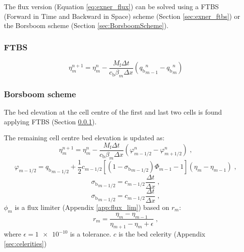 \documentclass{deltares_report_elv}
\newcommand{\mathsub}[2]{#1_{\mathrm{#2}}}
\begin{document}
\newcommand{\BorsboomScheme}{Borsboom scheme}

The flux version (Equation \ref{eq:exner_flux}) can be solved using a FTBS (Forward in Time and Backward in Space) scheme (Section \ref{sec:exner_ftbs}) or the \BorsboomScheme{} (Section \ref{sec:BorsboomScheme}). 

\subsubsection{FTBS}
\label{sec:exner_FTBS}

\begin{equation}
\eta_{m}^{n+1}=\eta_{m}^{n}-\frac{\mathsub{M}{f}\Delta t}{\mathsub{c}{b}\beta_{m}\Delta x}\left(\left.\mathsub{q}{b}\right._{m-1}^{n}-\left.\mathsub{q}{b}\right._{m}^{n}\right)
\end{equation}

\subsubsection{\BorsboomScheme{}}

The bed elevation at the cell centre of the first and last two cells is found applying FTBS (Section \ref{sec:exner_FTBS}). 

The remaining cell centre bed elevation is updated as:
\begin{equation}
\label{eq:exner_borsboom}
\eta_{m}^{n+1}=\eta_{m}^{n}-\frac{\mathsub{M}{f}\Delta t}{\mathsub{c}{b}\beta_{m}\Delta x}\left(\varphi_{m-1/2}^{n}-\varphi_{m+1/2}^{n}\right) \;,
\end{equation}
%
\begin{equation}
\label{eq:phi_borsboom}
\varphi_{m-1/2}=\left.\mathsub{q}{b}\right._{m-1/2}+\frac{1}{2}c_{m-1/2}\left[\left(1-\left.\mathsub{\sigma}{b}\right._{m-1/2}\right)\Phi_{m-1}-1\right]\left(\eta_{m}-\eta_{m-1}\right) \;,
\end{equation}
%
\begin{equation}
\label{eq:sigma_borsboom}
\left.\mathsub{\sigma}{b}\right._{m-1/2}=c_{m-1/2}\frac{\Delta t}{\Delta x} \;,
\end{equation}
%
\begin{equation}
\label{eq:sigma_borsboom}
\left.\mathsub{\sigma}{b}\right._{m-1/2}=c_{m-1/2}\frac{\Delta t}{\Delta x} \;,
\end{equation}
%
$\phi_{m}$ is a flux limiter (Appendix \ref{app:flux_lim}) based on $r_{m}$:
\begin{equation}
\label{eq:r_borsboom}
r_{m}=\frac{\eta_m-\eta_{m-1}}{\eta_{m+1}-\eta_m+\epsilon} \;,
\end{equation}
where $\epsilon=\num{1e-10}$ is a tolerance. 
%
$c$ is the bed celerity (Appendix \ref{sec:celerities})
\end{document}
